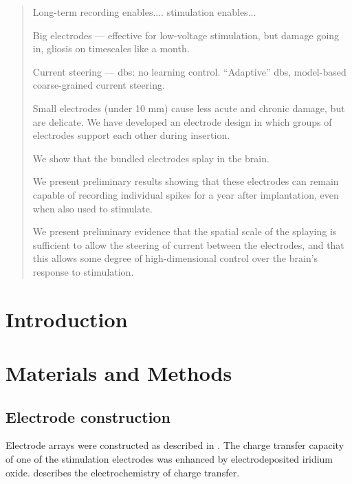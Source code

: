 \documentclass[10pt,letterpaper]{article}
\begin{document}
\reversemarginpar



\begin{abstract}
  Long-term recording enables.... stimulation enables...
  
  Big electrodes --- effective for low-voltage stimulation, but damage going in, gliosis on timescales like a month.

  Current steering --- dbs: no learning control.  ``Adaptive'' dbs, model-based coarse-grained current steering.

  Small electrodes (under 10 mm) cause less acute and chronic damage, but are delicate.  We have developed an electrode design in which groups of electrodes support each other during insertion.
  
  We show that the bundled electrodes splay in the brain.

  We present preliminary results showing that these electrodes can remain capable of recording individual spikes for a year after implantation, even when also used to stimulate.

  We present preliminary evidence that the spatial scale of the splaying is sufficient to allow the steering of current between the electrodes, and that this allows some degree of high-dimensional control over the brain's response to stimulation.
\end{abstract}

\linenumbers

\section{Introduction}



\section{Materials and Methods}


\subsection{Electrode construction}

Electrode arrays were constructed as described in
\cite{Guitchounts2013electrode}.  The charge transfer capacity of one
of the stimulation electrodes was enhanced by electrodeposited iridium
oxide.  \cite{Cogan2008electrodes} describes the electrochemistry of
charge transfer.
\end{document}
